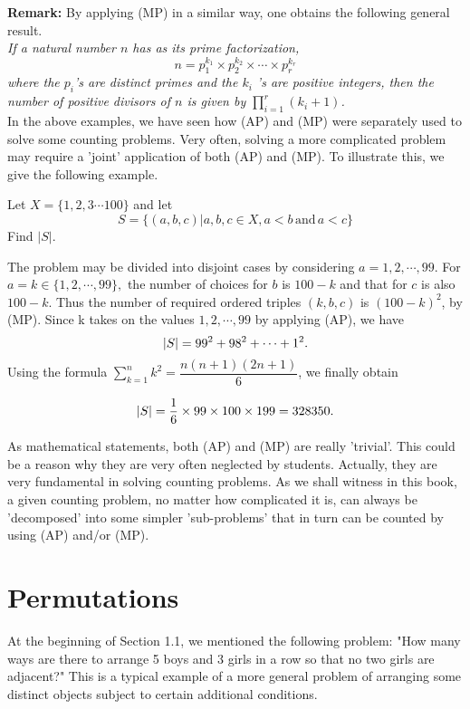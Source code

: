 \documentclass[a4paper,11pt]{book}
\begin{document}
\textbf{ Remark:}
By applying (MP) in a similar way, one obtains the following 
general result. \\
\textit{If a natural number $n$ has as its prime factorization, }
\[ n = p_{1}^{k_{1}}\times p_{2}^{k_{2}} \times \cdots \times p_{r}^{k_{r}}   \]
\textit{where the $p_{i}$'s are distinct primes and the $k_i$ 's are positive integers, then the number of positive divisors of $n$ is given by $\prod\limits_{i=1}^{r}(k_{i}+1)$. }\\
In the above examples, we have seen how (AP) and (MP) were separately used to solve some counting problems. Very often, solving a more 
complicated problem may require a 'joint' application of both (AP) and 
(MP). To illustrate this, we give the following example. 
\begin{example}
Let $X = \{1,2,3\cdots 100 \}$ and let
\[ S = \{(a,b,c)| a,b,c\in X, a<b\, \text{and}\, a<c \} \]
Find $|S|$.
\end{example}

\begin{soln}
The problem may be divided into disjoint cases by considering $a = 1, 2,\cdots, 99.$ For $a = k\in \{1, 2, \cdots, 99\},$ the number of choices for $b$ is $100 - k$ and that for $c$ is also $100 - k$. Thus the number of required ordered triples $(k, b, c)$ is $(100 - k)^2$, by (MP). Since k takes on the values $1,2, \cdots,99$ by applying (AP), we have 
\[\left\lvert S \right\rvert = 99^2 + 98^2 +\cdots + 1^2 .\] 
Using the formula $\sum\limits_{k=1}^{n} k^2 = \dfrac{n(n + 1)(2n + 1)}{6} $, we finally obtain 

\[ \left\lvert S \right\rvert = \frac{1}{6} \times 99 \times 100 \times199 = 328350. \] 
\end{soln}
As mathematical statements, both (AP) and (MP) are really 'trivial'. 
This could be a reason why they are very often neglected by students. Actually, they are very fundamental in solving counting problems. As we shall witness in this book, a given counting problem, no matter how complicated it is, can always be 'decomposed' into some simpler 'sub-problems' that in turn can be counted by using (AP) and/or (MP). \\

\section{Permutations}
At the beginning of Section 1.1, we mentioned the following problem: "How many ways are there to arrange 5 boys and 3 girls in a row so that no two girls are adjacent?" This is a typical example of a more general problem of arranging some distinct objects subject to certain additional conditions. \\
\end{document}
